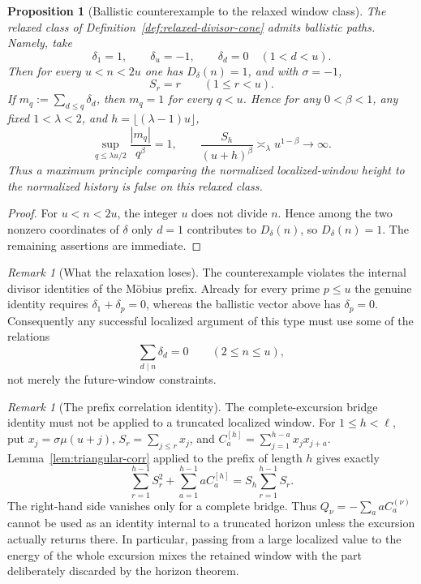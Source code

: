 \documentclass[11pt]{amsart}
\numberwithin{equation}{section}
\theoremstyle{plain}
\newtheorem{proposition}[theorem]{Proposition}
\theoremstyle{definition}
\theoremstyle{remark}
\newtheorem{remark}[theorem]{Remark}
\begin{document}
\begin{proposition}[Ballistic counterexample to the relaxed window class]
\label{prop:relaxed-ballistic}
The relaxed class of Definition~\ref{def:relaxed-divisor-cone} admits
ballistic paths.  Namely, take
\[
\delta_1=1,\qquad\delta_u=-1,\qquad\delta_d=0\quad(1<d<u).
\]
Then for every $u<n<2u$ one has $D_\delta(n)=1$, and with $\sigma=-1$,
\[
S_r=r\qquad(1\le r<u).
\]
If $m_q:=\sum_{d\le q}\delta_d$, then $m_q=1$ for every $q<u$.  Hence for
any $0<\beta<1$, any fixed $1<\lambda<2$, and
$h=\lfloor(\lambda-1)u\rfloor$,
\[
\sup_{q\le\lambda u/2}\frac{|m_q|}{q^\beta}=1,
\qquad
\frac{S_h}{(u+h)^\beta}\asymp_\lambda u^{1-\beta}\longrightarrow\infty.
\]
Thus a maximum principle comparing the normalized localized-window height
to the normalized history is false on this relaxed class.
\end{proposition}

\begin{proof}
For $u<n<2u$, the integer $u$ does not divide $n$.  Hence among the two
nonzero coordinates of $\delta$ only $d=1$ contributes to $D_\delta(n)$,
so $D_\delta(n)=1$.  The remaining assertions are immediate.
\end{proof}

\begin{remark}[What the relaxation loses]
\label{rem:relaxed-loses}
The counterexample violates the internal divisor identities of the M\"obius
prefix.  Already for every prime $p\le u$ the genuine identity requires
$\delta_1+\delta_p=0$, whereas the ballistic vector above has
$\delta_p=0$.  Consequently any successful localized argument of this type
must use some of the relations
\[
\sum_{d\mid n}\delta_d=0\qquad(2\le n\le u),
\]
not merely the future-window constraints.
\end{remark}

\begin{remark}[The prefix correlation identity]
\label{rem:prefix-correlation}
The complete-excursion bridge identity must not be applied to a truncated
localized window.  For $1\le h<\ell$, put
$x_j=\sigma\mu(u+j)$,
$S_r=\sum_{j\le r}x_j$, and
$C_a^{[h]}=\sum_{j=1}^{h-a}x_jx_{j+a}$.  Lemma~\ref{lem:triangular-corr}
applied to the prefix of length $h$ gives exactly
\[
\sum_{r=1}^{h-1}S_r^2+\sum_{a=1}^{h-1}aC_a^{[h]}
=S_h\sum_{r=1}^{h-1}S_r.
\]
The right-hand side vanishes only for a complete bridge.  Thus
$Q_\nu=-\sum_a aC_a^{(\nu)}$ cannot be used as an identity internal to a
truncated horizon unless the excursion actually returns there.  In
particular, passing from a large localized value to the energy of the whole
excursion mixes the retained window with the part deliberately discarded by
the horizon theorem.
\end{remark}
\end{document}
